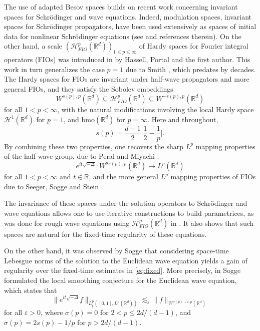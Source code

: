 \documentclass{amsart}
\theoremstyle{definition}
\newcommand{\R}{\mathbb{R}}
\newcommand {\Rd}{\mathbb{R}^{d}}
\newcommand {\Hp}{\mathcal{H}^{p}_{FIO}(\Rd)}
\newcommand {\HT}{\mathcal{H}}
\newcommand {\bmo}{\mathrm{bmo}}
\newcommand {\veps}{\varepsilon}
\numberwithin{equation}{section}
\begin{document}
The use of adapted Besov spaces builds on recent work concerning invariant spaces for Schr\"{o}dinger and wave equations. Indeed, modulation spaces, invariant spaces for Schr\"{o}dinger propagators, have been used extensively as spaces of initial data for nonlinear Schr\"{o}dinger equations (see \cite{GuoWangZhao2006,ChaichenetsHundertmarkKunstmannPattakos2017,ChaichenetsHundertmarkKunstmannPattakos2019,Schippa2022} and references therein). On the other hand, a scale $(\Hp)_{1\leq p\leq \infty}$ of Hardy spaces for Fourier integral operators (FIOs) was introduced in \cite{HassellPortalRozendaal2020} by Hassell, Portal and the first author. This work in turn generalizes the case $p=1$ due to Smith \cite{Smith1998}, which predates \cite{HassellPortalRozendaal2020} by decades. The Hardy spaces for FIOs are invariant under half-wave propagators and more general FIOs, and they satisfy the Sobolev embeddings
\begin{equation}\label{eq:Sobolevintro}
W^{s(p),p}(\Rd)\subseteq \Hp\subseteq W^{-s(p),p}(\Rd)
\end{equation}
for all $1<p<\infty$, with the natural modifications involving the local Hardy space $\HT^{1}(\Rd)$ for $p=1$, and $\bmo(\Rd)$ for $p=\infty$. Here and throughout,
\begin{equation}\label{eq:sp}
s(p)=\frac{d-1}{2}\Big|\frac{1}{2}-\frac{1}{p}\Big|.
\end{equation}
By combining these two properties, one recovers the sharp $L^{p}$ mapping properties of the half-wave group, due to Peral and Miyachi \cite{Peral1980,Miyachi1980}:
\begin{equation}\label{eq:fixed}
e^{it\sqrt{-\Delta}}:W^{2s(p),p}(\Rd)\to L^{p}(\Rd)
\end{equation}
for all $1<p<\infty$ and $t\in\R$, and the more general $L^{p}$ mapping properties of FIOs due to Seeger, Sogge and Stein \cite{SeegerSoggeStein1991}.

The invariance of these spaces under the solution operators to Schr\"{o}dinger and wave equations allows one to use iterative constructions to build parametrices, as was done for rough wave equations using $\Hp$ in \cite{HassellRozendaal2020}. It also shows that such spaces are natural for the fixed-time regularity of these equations.

On the other hand, it was observed by Sogge \cite{Sogge1991} that considering space-time Lebesgue norms of the solution to the Euclidean wave equation yields a gain of regularity over the fixed-time estimates in \eqref{eq:fixed}. More precisely, in \cite{Sogge1991} Sogge formulated the local smoothing conjecture for the Euclidean wave equation, which states that
\begin{equation}
\label{eq:LocalSmoothingConjecture}
\| e^{it \sqrt{- \Delta}} f \|_{L_t^p([0,1],L^p(\R^d))} \lesssim_{\veps} \| f \|_{W^{\sigma(p)+\veps,p}(\R^d)}
\end{equation}
for all $\veps>0$, where $\sigma(p)=0$ for $2<p\leq 2d/(d-1)$, and $\sigma(p)=2s(p)-1/p$ for $p>2d/(d-1)$.
\end{document}
